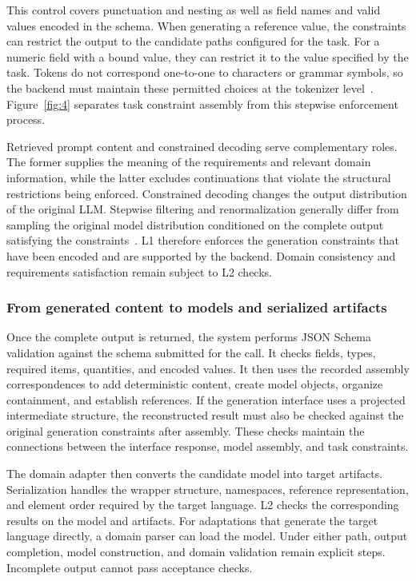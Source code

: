 \documentclass[pdflatex,iicol,sn-mathphys-num]{sn-jnl}
\newcommand{\paperref}[1]{~\citep{#1}}
\begin{document}
This control covers punctuation and nesting as well as field names and valid values encoded in the schema. When generating a reference value, the constraints can restrict the output to the candidate paths configured for the task. For a numeric field with a bound value, they can restrict it to the value specified by the task. Tokens do not correspond one-to-one to characters or grammar symbols, so the backend must maintain these permitted choices at the tokenizer level\paperref{MLSYS2025_5c20ca4b}. Figure~\ref{fig:4} separates task constraint assembly from this stepwise enforcement process.


Retrieved prompt content and constrained decoding serve complementary roles. The former supplies the meaning of the requirements and relevant domain information, while the latter excludes continuations that violate the structural restrictions being enforced. Constrained decoding changes the output distribution of the original LLM. Stepwise filtering and renormalization generally differ from sampling the original model distribution conditioned on the complete output satisfying the constraints\paperref{NEURIPS2024_2bdc2267}. L1 therefore enforces the generation constraints that have been encoded and are supported by the backend. Domain consistency and requirements satisfaction remain subject to L2 checks.


\subsubsection{From generated content to models and serialized artifacts}\label{sec:method-3-5-3}

Once the complete output is returned, the system performs JSON Schema validation against the schema submitted for the call. It checks fields, types, required items, quantities, and encoded values. It then uses the recorded assembly correspondences to add deterministic content, create model objects, organize containment, and establish references. If the generation interface uses a projected intermediate structure, the reconstructed result must also be checked against the original generation constraints after assembly. These checks maintain the connections between the interface response, model assembly, and task constraints.


The domain adapter then converts the candidate model into target artifacts. Serialization handles the wrapper structure, namespaces, reference representation, and element order required by the target language. L2 checks the corresponding results on the model and artifacts. For adaptations that generate the target language directly, a domain parser can load the model. Under either path, output completion, model construction, and domain validation remain explicit steps. Incomplete output cannot pass acceptance checks.
\end{document}

